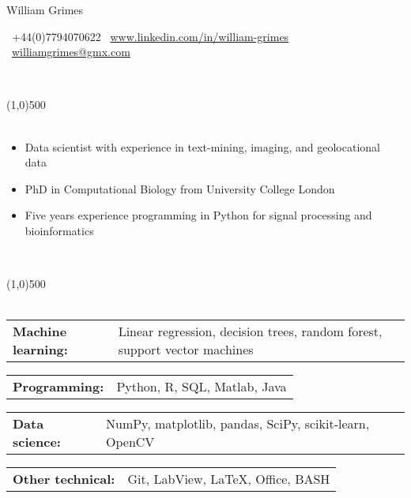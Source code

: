 \documentclass[11pt]{res}
\begin{document}
\centerline{{\Huge William Grimes}}
\vspace{-0.7em}


\Mobilefone \ \textcolor{mygray}{+44(0)7794070622 \hfill}
\ComputerMouse \ \url{www.linkedin.com/in/william-grimes} \hfill 
\Letter \ \href{mailto:williamgrimes@gmx.com}{williamgrimes@gmx.com}

\vspace{-1.0em}
\begin{flushleft}
\\
\end{flushleft}
\vspace{-3.2em}

\line(1,0){500}\\\smallskip
\vspace*{-0.8cm}
\nolinebreak\\
\begin{itemize} %
	\item Data scientist with experience in text-mining, imaging, and geolocational data
	\item PhD in Computational Biology from University College London 
	\item Five years experience programming in Python for signal processing and bioinformatics
\end{itemize}

\vspace{-1.2em}
\begin{flushleft}
\\
\end{flushleft}
\vspace{-3.2em}
\line(1,0){500}\\
\vspace*{-0.3cm}
\nolinebreak\\
\begin{tabular}{@{} p{3.3cm} p{14.0cm} @{}} {\bf Machine learning:} & \textcolor{mygray}{Linear regression, decision trees, random forest, support vector machines} \end{tabular}
\begin{tabular}{@{} p{3.3cm} p{14.0cm} @{}} {\bf Programming:} & \textcolor{mygray}{Python, R, SQL, Matlab, Java}\end{tabular}
\begin{tabular}{@{} p{3.3cm} p{14.0cm} @{}} {\bf Data science:} & \textcolor{mygray}{NumPy, matplotlib, pandas, SciPy, scikit-learn, OpenCV }\end{tabular}
\begin{tabular}{@{} p{3.3cm} p{14.0cm} @{}} {\bf Other technical:} & \textcolor{mygray}{ Git, LabView, \LaTeX, Office, BASH} \end{tabular}
\end{document}
